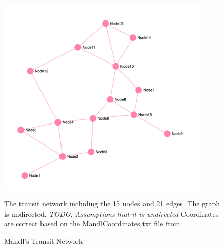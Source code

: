 \begin{figure}[H]
\begin{center}
  \includegraphics[width=4in]{assets/mandlnetwork_crop.png}
  \end{center}
  \caption[Transit Network]
   {Mandl's Transit Network} 
   The transit network including the 15 nodes and 21 edges. The graph is undirected. \emph{\color{red} TODO: Assumptions that it is undirected} Coordinates are correct based on the MandlCoordinates.txt file from \citep{mumford13}
\end{figure}